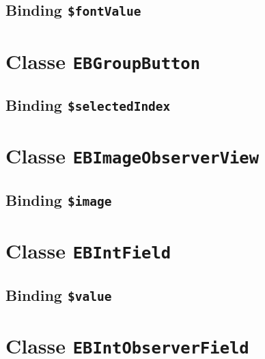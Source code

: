 \subsection{Binding \texttt{\$fontValue}}








\section{Classe \texttt{EBGroupButton}}

\subsection{Binding \texttt{\$selectedIndex}}








\section{Classe \texttt{EBImageObserverView}}

\subsection{Binding \texttt{\$image}}








\section{Classe \texttt{EBIntField}}

\subsection{Binding \texttt{\$value}}








\section{Classe \texttt{EBIntObserverField}}

